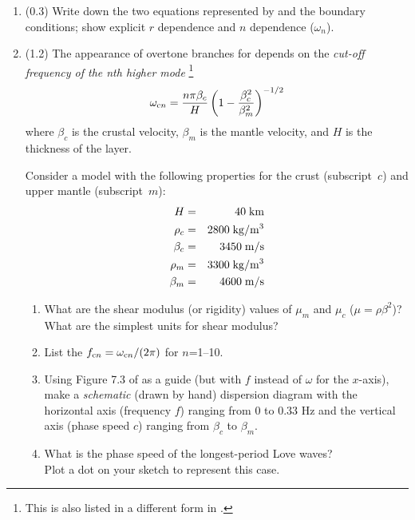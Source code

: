 \documentclass[11pt,titlepage,fleqn]{article}
\begin{document}
\begin{enumerate}

\item (0.3) Write down the two equations represented by  and the boundary conditions; show explicit $r$ dependence and $n$ dependence (\eg $\omega_n$). 


\item (1.2) The appearance of overtone branches for  depends on the {\em cut-off frequency of the nth higher mode} \citep[][Eq. 7.8]{AkiRichardsE2}\footnote{This is also listed in a different form in \citet[][p. 92]{SteinWysession}.}
%
\begin{equation}
\omega_{{\rm c}n} = \frac{n\pi \beta_c}{H} \left( 1 - \frac{\beta_c^2}{\beta_m^2}\right)^{-1/2}
\end{equation}
%
where $\beta_c$ is the crustal velocity, $\beta_m$ is the mantle velocity, and $H$ is the thickness of the layer.

Consider a model with the following properties for the crust (subscript~$c$) and upper mantle (subscript~$m$):
%
\begin{eqnarray*}
H &=& 40\;{\rm km}
\\
\rho_c &=& 2800 \;{\rm kg/m^3}
\\
\beta_c &=& 3450 \;{\rm m/s}
\\
\rho_m &=& 3300 \;{\rm kg/m^3}
\\
\beta_m &=& 4600 \;{\rm m/s}
\end{eqnarray*}

\begin{enumerate}
\item What are the shear modulus (or rigidity) values of $\mu_m$ and $\mu_c$ ($\mu = \rho\beta^2$)? \\
What are the simplest units for shear modulus?

\item List the $f_{{\rm c}n} = \omega_{{\rm c}n}/(2\pi)$ for $n$=1--10.

\item Using Figure 7.3 of \citet{AkiRichardsE2} as a guide (but with $f$ instead of $\omega$ for the $x$-axis), make a {\em schematic} (\ie drawn by hand) dispersion diagram with the horizontal axis (frequency $f$) ranging from 0 to 0.33 Hz and the vertical axis (phase speed $c$) ranging from $\beta_c$ to $\beta_m$.

\item What is the phase speed of the longest-period Love waves? \\
Plot a dot on your sketch to represent this case.


\end{enumerate}
\end{enumerate}
\end{document}
